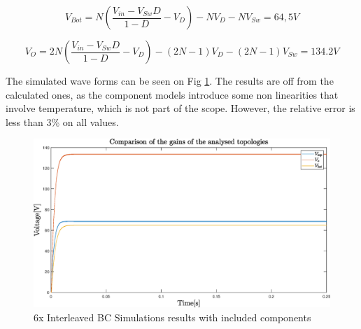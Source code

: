 \begin{equation}
	V_{Bot}= N(\frac{V_{in}-V_{Sw}D}{1-D}-V_D)-NV_D-NV_{Sw}= 64,5V
	\label{eq:DROPS_V_BOT_SIM}
\end{equation}

\begin{equation}
	V_{O}=2N(\frac{V_{in}-V_{Sw}D}{1-D}-V_D)-(2N-1)V_D-(2N-1)V_{Sw}= 134.2V
	\label{eq:DROPS_2INX_FINAL_SIM}
\end{equation}


The simulated wave forms can be seen on Fig \ref{fig:MBC_2NxSimResult_DROPS}. The results are off from the calculated ones, as the component models introduce some non linearities that involve temperature, which is not part of the scope. However, the relative error is less than 3\% on all values. 

\begin{figure}[H]
   \centering
   \includegraphics[width=\textwidth]{figures/zComponentDrops/compare_LTSpice.eps}
    \caption{6x Interleaved BC Simulations results with included components}
	\label{fig:MBC_2NxSimResult_DROPS}
\end{figure}

